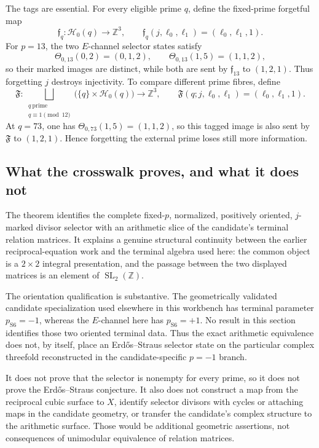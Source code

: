The tags are essential.  For every eligible prime \(q\), define the
fixed-prime forgetful map
\[
 \mathfrak f_q:\mathcal H_0(q)\longrightarrow\mathbb Z^3,
 \qquad
 \mathfrak f_q(j,\ell_0,\ell_1)=(\ell_0,\ell_1,1).
\]
For \(p=13\), the two \(E\)-channel selector states satisfy
\[
 \Theta_{0,13}(0,2)=(0,1,2),
 \qquad
 \Theta_{0,13}(1,5)=(1,1,2),
\]
so their marked images are distinct, while both are sent by
\(\mathfrak f_{13}\) to \((1,2,1)\).  Thus forgetting \(j\) destroys
injectivity.  To compare different prime fibres, define
\[
 \mathfrak F:
 \bigsqcup_{\substack{q\ \mathrm{prime}\\q\equiv1\pmod {12}}}
 \bigl(\{q\}\times\mathcal H_0(q)\bigr)
 \longrightarrow\mathbb Z^3,
 \qquad
 \mathfrak F(q;j,\ell_0,\ell_1)=(\ell_0,\ell_1,1).
\]
At \(q=73\), one has \(\Theta_{0,73}(1,5)=(1,1,2)\), so this tagged
image is also sent by \(\mathfrak F\) to \((1,2,1)\).  Hence forgetting
the external prime loses still more information.

\subsection{What the crosswalk proves, and what it does not}

The theorem identifies the complete fixed-\(p\), normalized, positively
oriented, \(j\)-marked divisor selector with an arithmetic slice of the
candidate's terminal relation matrices.  It explains a genuine structural
continuity between the earlier reciprocal-equation work and the terminal
algebra used here: the common object is a \(2\times2\) integral presentation,
and the passage between the two displayed matrices is an element of
\(\operatorname{SL}_2(\mathbb Z)\).

The orientation qualification is substantive.  The geometrically validated
candidate specialization used elsewhere in this workbench has terminal
parameter \(p_{\mathrm{S6}}=-1\), whereas the \(E\)-channel here has
\(p_{\mathrm{S6}}=+1\).  No result in this section identifies those two
oriented terminal data.  Thus the exact arithmetic equivalence does not, by
itself, place an Erd\H{o}s--Straus selector state on the particular complex
threefold reconstructed in the candidate-specific \(p=-1\) branch.

It does not prove that the selector is nonempty for every prime, so it does
not prove the Erd\H{o}s--Straus conjecture.  It also does not construct a map
from the reciprocal cubic surface to \(X\), identify selector divisors with
cycles or attaching maps in the candidate geometry, or transfer the
candidate's complex structure to the arithmetic surface.  Those would be
additional geometric assertions, not consequences of unimodular equivalence
of relation matrices.
